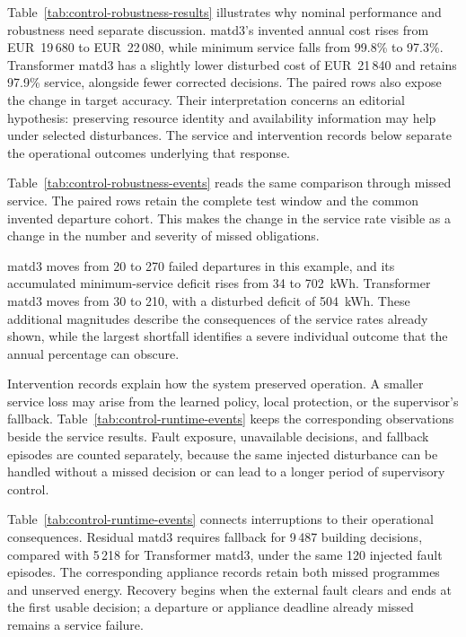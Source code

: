 

\illustrativereading Table~\ref{tab:control-robustness-results} illustrates why nominal performance and robustness need separate discussion. \gls{matd3}'s invented annual cost rises from EUR~19\,680 to EUR~22\,080, while minimum service falls from 99.8\% to 97.3\%. Transformer \gls{matd3} has a slightly lower disturbed cost of EUR~21\,840 and retains 97.9\% service, alongside fewer corrected decisions. The paired rows also expose the change in target accuracy. Their interpretation concerns an editorial hypothesis: preserving resource identity and availability information may help under selected disturbances. The service and intervention records below separate the operational outcomes underlying that response.


Table~\ref{tab:control-robustness-events} reads the same comparison through missed service. The paired rows retain the complete test window and the common invented departure cohort. This makes the change in the service rate visible as a change in the number and severity of missed obligations.



\illustrativereading \gls{matd3} moves from 20 to 270 failed departures in this example, and its accumulated minimum-service deficit rises from 34 to 702~kWh. Transformer \gls{matd3} moves from 30 to 210, with a disturbed deficit of 504~kWh. These additional magnitudes describe the consequences of the service rates already shown, while the largest shortfall identifies a severe individual outcome that the annual percentage can obscure.

Intervention records explain how the system preserved operation. A smaller service loss may arise from the learned policy, local protection, or the supervisor's fallback. Table~\ref{tab:control-runtime-events} keeps the corresponding observations beside the service results. Fault exposure, unavailable decisions, and fallback episodes are counted separately, because the same injected disturbance can be handled without a missed decision or can lead to a longer period of supervisory control.



\illustrativereading Table~\ref{tab:control-runtime-events} connects interruptions to their operational consequences. Residual \gls{matd3} requires fallback for 9\,487 building decisions, compared with 5\,218 for Transformer \gls{matd3}, under the same 120 injected fault episodes. The corresponding appliance records retain both missed programmes and unserved energy. Recovery begins when the external fault clears and ends at the first usable decision; a departure or appliance deadline already missed remains a service failure.

